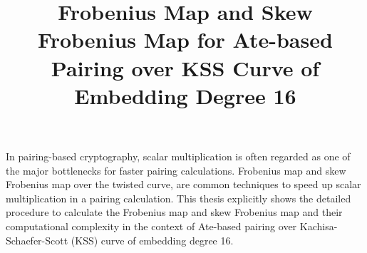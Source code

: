 





\title{Frobenius Map and Skew Frobenius Map for Ate-based Pairing over KSS Curve of Embedding Degree 16}

In pairing-based cryptography, scalar multiplication is often regarded as one of the major bottlenecks for faster pairing calculations. Frobenius map and skew Frobenius map over the twisted curve, are common techniques to speed up scalar multiplication in a pairing calculation. This thesis explicitly shows the detailed procedure to calculate the Frobenius map and skew Frobenius map and their computational complexity in the context of Ate-based pairing over Kachisa-Schaefer-Scott (KSS) curve of embedding degree 16.


